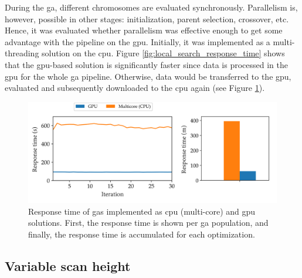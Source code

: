 During the \acrshort{ga}, different chromosomes are evaluated synchronously. Parallelism is, however, possible in other stages: initialization, parent selection, crossover, etc. Hence, it was evaluated whether parallelism was effective enough to get some advantage with the pipeline on the \acrshort{gpu}. Initially, it was implemented as a multi-threading solution on the \acrshort{cpu}. Figure \ref{fig:local_search_response_time} shows that the \acrshort{gpu}-based solution is significantly faster since data is processed in the \acrshort{gpu} for the whole \acrshort{ga} pipeline. Otherwise, data would be transferred to the \acrshort{gpu}, evaluated and subsequently downloaded to the \acrshort{cpu} again (see Figure \ref{fig:ga_response_time}).

\begin{figure}
    \centering
    \includegraphics[width=\linewidth]{figs/lidar_optimization/response_time_results_ga.png}
	\caption{Response time of \acrshort{ga}s implemented as \acrshort{cpu} (multi-core) and \acrshort{gpu} solutions. First, the response time is shown per \acrshort{ga} population, and finally, the response time is accumulated for each optimization.}
	\label{fig:ga_response_time}
\end{figure}

\subsection{Variable scan height}

